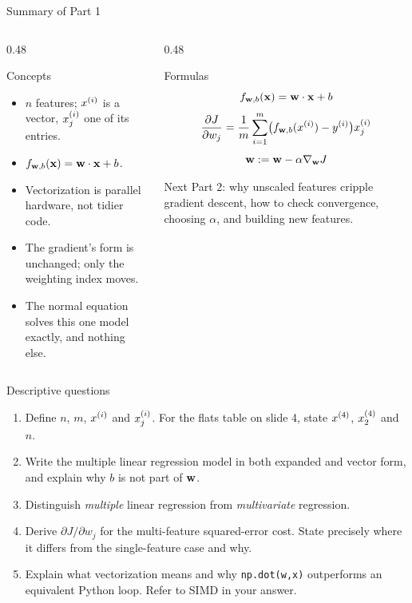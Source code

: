 \documentclass[aspectratio=169,10pt]{beamer}
\begin{document}
\begin{frame}{Summary of Part 1}
  \small
  \begin{columns}[T,onlytextwidth]
    \begin{column}{0.48\textwidth}
      \begin{block}{Concepts}
        \begin{itemize}
          \item $n$ features; $x^{(i)}$ is a vector, $x^{(i)}_{j}$ one of its entries.
          \item $f_{\mathbf{w},b}(\mathbf{x})=\mathbf{w}\cdot\mathbf{x}+b$.
          \item Vectorization is parallel hardware, not tidier code.
          \item The gradient's form is unchanged; only the weighting index moves.
          \item The normal equation solves this one model exactly, and nothing else.
        \end{itemize}
      \end{block}
    \end{column}
    \begin{column}{0.48\textwidth}
      \begin{block}{Formulas}
        \[ f_{\mathbf{w},b}(\mathbf{x})=\mathbf{w}\cdot\mathbf{x}+b \]
        \[ \frac{\partial J}{\partial w_j}=\frac1m\sum_{i=1}^{m}\bigl(f_{\mathbf{w},b}(x^{(i)})-y^{(i)}\bigr)x^{(i)}_{j} \]
        \[ \mathbf{w} := \mathbf{w} - \alpha\nabla_{\mathbf{w}}J \]
      \end{block}
      \begin{block}{Next}
        \small Part 2: why unscaled features cripple gradient descent, how to check
        convergence, choosing $\alpha$, and building new features.
      \end{block}
    \end{column}
  \end{columns}
\end{frame}

\begin{frame}{Descriptive questions}
  \footnotesize
  \begin{enumerate}
    \item Define $n$, $m$, $x^{(i)}$ and $x^{(i)}_{j}$. For the flats table on slide 4, state
          $x^{(4)}$, $x^{(4)}_{2}$ and $n$. \hfill{}
    \item Write the multiple linear regression model in both expanded and vector form, and
          explain why $b$ is not part of $\mathbf{w}$. \hfill{}
    \item Distinguish \emph{multiple} linear regression from \emph{multivariate} regression.
          \hfill{}
    \item Derive $\partial J/\partial w_j$ for the multi-feature squared-error cost. State
          precisely where it differs from the single-feature case and why. \hfill{}
    \item Explain what vectorization means and why \texttt{np.dot(w,x)} outperforms an
          equivalent Python loop. Refer to SIMD in your answer. \hfill{}
  \end{enumerate}
\end{frame}
\end{document}
